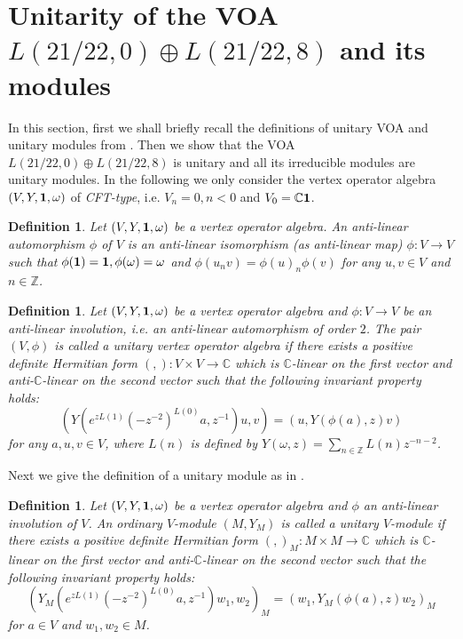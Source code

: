 \documentclass{article}
\newtheorem{definition}[lemma]{Definition}
\def\C{{\mathbb C}}
\def\Z{{\mathbb Z}}
\def\1{{\bf 1}}
\begin{document}
	
	

\section{Unitarity of the VOA $L(21/22, 0)\oplus L(21/22, 8)$ and its modules}

In this section, first we shall briefly recall the definitions of unitary VOA and unitary modules from \cite{DLin1}. Then we show that the VOA $L(21/22, 0)\oplus L(21/22, 8)$ is unitary and all its irreducible modules are unitary modules.
In the following we only consider the vertex operator algebra $(V, Y, \1, \omega)$ of \emph{CFT-type}, i.e. $V_n=0, n<0$ and $V_0=\mathbb{C}\1$.
\begin{definition}
	Let $(V, Y, \1, \omega)$ be a vertex operator algebra. An anti-linear automorphism $\phi$ of $V$ is
	an anti-linear isomorphism (as anti-linear map) $\phi:V\to V$ such
	that $\phi(\bf1)=\bf1, \phi(\omega)=\omega$ and
	$\phi(u_nv)=\phi(u)_n\phi(v)$ for any $ u, v\in V$ and $n\in
	\mathbb{Z}$.
\end{definition}

\begin{definition}
	Let $(V, Y, \1, \omega)$ be a vertex operator algebra and $\phi: V\to V$ be an anti-linear involution, i.e. an anti-linear automorphism of order $2$. The pair $(V, \phi)$ is called  a unitary vertex operator algebra if there exists a positive definite Hermitian form $(,): V\times V\to \mathbb{C}$
	which is $\C$-linear on the first vector and anti-$\C$-linear on the second vector such that the following invariant property holds:\\
	$$(Y(e^{zL(1)}(-z^{-2})^{L(0)}a, z^{-1})u, v)=(u, Y(\phi(a), z)v)$$
	for any $a, u, v\in V$, where $L(n)$ is defined by $Y(\omega, z)=\sum_{n\in \Z}L(n)z^{-n-2}$.
\end{definition}

Next we give the definition of a unitary module as in \cite{DLin1}.
\begin{definition}\label{unimod} Let $(V, Y, \1, \omega)$ be a vertex operator algebra and $\phi$ an anti-linear involution of $V$. An ordinary $V$-module $(M, Y_M)$ is called a unitary $V$-module if there exists a positive definite
	Hermitian form $(,)_M: M\times M\to \mathbb{C}$ which is $\C$-linear on the first vector and anti-$\C$-linear on the second vector such that the following invariant property holds:	$$(Y_M(e^{zL(1)}(-z^{-2})^{L(0)}a, z^{-1})w_1, w_2)_M=(w_1, Y_M(\phi(a),z)w_2)_M$$  for $a \in V $ and $w_1, w_2\in M$.
\end{definition}
\end{document}
